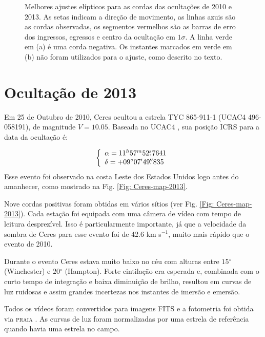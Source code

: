 \documentclass[12pt,a4paper]{monografia}
\newcommand{\degr}{\ensuremath{^{\circ}}}%
\newcommand{\arcmin}{\ensuremath{^{\prime}}}%
\newcommand{\fs}{\mbox{\ensuremath{.\!\!^s}}}
\newcommand{\farcs}{\mbox{\ensuremath{.\!\!^{\prime\prime}}}}%
\begin{document}
\begin{figure}[h]
\begin{centering}
\caption{Melhores ajustes elípticos para as cordas das ocultações de 2010 e 2013. As setas indicam a direção de movimento, as linhas azuis são as cordas observadas, os segmentos vermelhos são as barras de erro dos ingressos, egressos e centro da ocultação em $1\sigma$. A linha verde em (a) é uma corda negativa. Os instantes marcados em verde em (b) não foram utilizados para o ajuste, como descrito no texto.
\label{Fig: Ceres-limb}}
\end{centering}
\end{figure}


\section{Ocultação de 2013}
\label{Sec: Ceres-2013-occ}

\indent \indent Em 25 de Outubro de 2010, Ceres ocultou a estrela TYC 865-911-1 (UCAC4 496-058191), de magnitude $V = 10.05$. Baseada no UCAC4 \citep{Zacharias2013}, sua posição ICRS para a data da ocultação é:

%
\begin{equation}
\left\{ 
  \begin{array}{l l}
    \alpha = 11^{h}57^{m}52\fs7641\\
    \delta = +09\degr 07\arcmin 49\farcs835
  \end{array}
\right.
\end{equation}
%
Esse evento foi observado na costa Leste dos Estados Unidos logo antes do amanhecer, como mostrado na Fig. \ref{Fig: Ceres-map-2013}.

Nove cordas positivas foram obtidas em vários sítios (ver Fig. \ref{Fig: Ceres-map-2013}). Cada estação foi equipada com uma câmera de vídeo com tempo de leitura desprezível. Isso é particularmente importante, já que a velocidade da sombra de Ceres para esse evento foi de 42.6 km s$^{-1}$, muito mais rápido que o evento de 2010.

Durante o evento Ceres estava muito baixo no céu com alturas entre $15\degr$ (Winchester) e $20\degr$ (Hampton). Forte cintilação era esperada e, combinada com o curto tempo de integração e baixa diminuição de brilho, resultou em curvas de luz ruidosas e assim grandes incertezas nos instantes de imersão e emersão.

Todos os vídeos foram convertidos para imagens FITS e a fotometria foi obtida via \textsc{praia} \cite{Assafin2011}. As curvas de luz foram normalizadas por uma estrela de referência quando havia uma estrela no campo.
\end{document}
